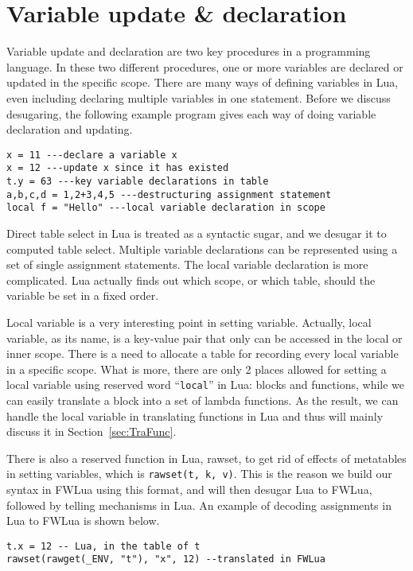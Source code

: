 \section{Variable update \& declaration}\label{sec:desugarVarUpdate}
Variable update and declaration are two key procedures in a programming language. 
In these two different procedures, one or more variables are declared or updated in the specific scope. There are many ways of defining variables in Lua, even including declaring multiple variables in one statement. Before we discuss desugaring, the following example program gives each way of doing variable declaration and updating.

\begin{verbatim}
x = 11 ---declare a variable x
x = 12 ---update x since it has existed
t.y = 63 ---key variable declarations in table
a,b,c,d = 1,2+3,4,5 ---destructuring assignment statement
local f = "Hello" ---local variable declaration in scope
\end{verbatim}

Direct table select in Lua is treated as a syntactic sugar, and we desugar it to computed table select. 
Multiple variable declarations can be represented using a set of single assignment statements. 
The local variable declaration is more complicated. Lua actually finds out which scope, or which table, should the variable be set in a fixed order. 

Local variable is a very interesting point in setting variable. Actually, local variable, as its name, is a key-value pair that only can be accessed in the local or inner scope. There is a need to allocate a table for recording every local variable in a specific scope. What is more, there are only 2 places allowed for setting a local variable using reserved word ``{\tt local}'' in Lua: blocks and functions, while we can easily translate a block into a set of lambda functions. As the result, we can handle the local variable in translating functions in Lua and thus will mainly discuss it in Section~\ref{sec:TraFunc}. 

There is also a reserved function in Lua, rawset, to get rid of effects of metatables in setting variables, which is {\tt rawset(t, k, v)}. This is the reason we build our syntax in FWLua using this format, and will then desugar Lua to FWLua, followed by telling mechanisms in Lua.
An example of decoding assignments in Lua to FWLua is shown below.

\begin{verbatim}
t.x = 12 -- Lua, in the table of t
rawset(rawget(_ENV, "t"), "x", 12) --translated in FWLua
\end{verbatim}

